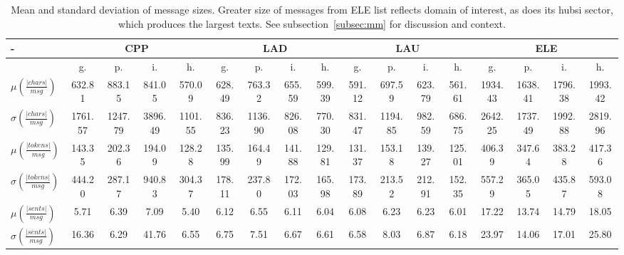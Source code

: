 \documentclass[%
 aip,
 jmp,%
 amsmath,amssymb,
 reprint,%
]{revtex4-1}
\begin{document}
\begin{table}
  \centering
    \footnotesize
\setlength{\tabcolsep}{.16667em}
  \begin{tabular}{|l|| c|c|c|c||  c|c|c|c||   c|c|c|c||   c|c|c|c|}\hline
-\-  & \multicolumn{4}{c|}{CPP} & \multicolumn{4}{c|}{LAD} & \multicolumn{4}{c|}{LAU} & \multicolumn{4}{c|}{ELE} \\ \hline
 & g. & p. & i. & h. &     g. & p. & i. & h. &    g. & p. & i. & h. &    g. & p. & i. & h. \\\hline
$\mu\left(\frac{|chars|}{msg}\right)$ & 632.81 & 883.15 & 841.05 & 570.09 & 628.49 & 763.32 & 655.59 & 599.39 & 591.12 & 697.59 & 623.79 & 561.61 & 1934.43 & 1638.41 & 1796.38 & 1993.42 \\
$\sigma\left(\frac{|chars|}{msg}\right)$ & 1761.57 & 1247.79 & 3896.49 & 1101.55 & 836.23 & 1136.90 & 826.08 & 770.30 & 831.47 & 1194.85 & 982.59 & 686.75 & 2642.25 & 1737.49 & 1992.88 & 2819.96 \\\hline
$\mu\left(\frac{|tokens|}{msg}\right)$ & 143.35 & 202.36 & 194.09 & 128.28 & 135.99 & 164.49 & 141.88 & 129.81 & 131.37 & 153.18 & 139.27 & 125.01 & 406.39 & 347.64 & 383.28 & 417.36 \\
$\sigma\left(\frac{|tokens|}{msg}\right)$ & 444.20 & 287.17 & 940.83 & 304.37 & 178.11 & 237.80 & 172.03 & 165.98 & 173.89 & 213.52 & 212.91 & 152.35 & 557.29 & 365.05 & 435.87 & 593.08 \\\hline
$\mu\left(\frac{|sents|}{msg}\right)$ & 5.71 & 6.39 & 7.09 & 5.40 & 6.12 & 6.55 & 6.11 & 6.04 & 6.08 & 6.23 & 6.23 & 6.01 & 17.22 & 13.74 & 14.79 & 18.05 \\
$\sigma\left(\frac{|sents|}{msg}\right)$ & 16.36 & 6.29 & 41.76 & 6.55 & 6.75 & 7.51 & 6.67 & 6.61 & 6.58 & 8.03 & 6.87 & 6.18 & 23.97 & 14.06 & 17.01 & 25.80 \\\hline
  \end{tabular}
  \caption{Mean and standard deviation of message sizes. Greater size of messages from ELE list reflects domain of interest, as does its hubsi sector, which produces the largest texts. See subsection~\ref{subsec:mm} for discussion and context.}
  \label{tab:sizesMsgs}
\end{table}
\end{document}
